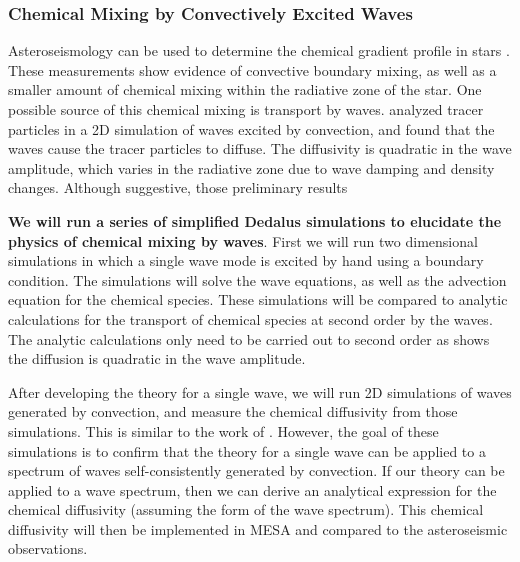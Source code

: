 {\color{purple}
\subsubsection{Chemical Mixing by Convectively Excited Waves}
}

Asteroseismology can be used to determine the chemical gradient profile in stars \citep{moravveji:15,moravveji:16,Ghasemi_2016}. These measurements show evidence of convective boundary mixing, as well as a smaller amount of chemical mixing within the radiative zone of the star. One possible source of this chemical mixing is transport by waves. \citet{Rogers2017} analyzed tracer particles in a 2D simulation of waves excited by convection, and found that the waves cause the tracer particles to diffuse. The diffusivity is quadratic in the wave amplitude, which varies in the radiative zone due to wave damping and density changes. Although suggestive, those preliminary results 

\textbf{We will run a series of simplified Dedalus simulations to elucidate the physics of chemical mixing by waves}. First we will run two dimensional simulations in which a single wave mode is excited by hand using a boundary condition. The simulations will solve the wave equations, as well as the advection equation for the chemical species. These simulations will be compared to analytic calculations for the transport of chemical species at second order by the waves. The analytic calculations only need to be carried out to second order as \citet{Rogers2017} shows the diffusion is quadratic in the wave amplitude.

After developing the theory for a single wave, we will run 2D simulations of waves generated by convection, and measure the chemical diffusivity from those simulations. This is similar to the work of \citet{Rogers2017}. However, the goal of these simulations is to confirm that the theory for a single wave can be applied to a spectrum of waves self-consistently generated by convection. If our theory can be applied to a wave spectrum, then we can derive an analytical expression for the chemical diffusivity (assuming the form of the wave spectrum). This chemical diffusivity will then be implemented in MESA and compared to the asteroseismic observations.
